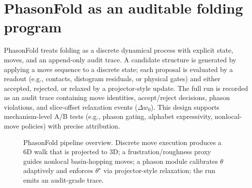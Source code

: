 \section{PhasonFold as an auditable folding program}

PhasonFold treats folding as a discrete dynamical process with explicit state, moves, and an append-only audit trace. A candidate structure is generated by applying a move sequence to a discrete state; each proposal is evaluated by a readout (e.g., contacts, distogram residuals, or physical gates) and either accepted, rejected, or relaxed by a projector-style update. The full run is recorded as an audit trace containing move identities, accept/reject decisions, phason violations, and slice-offset relaxation events ($\Delta w_0$). This design supports mechanism-level A/B tests (e.g., phason gating, alphabet expressivity, nonlocal-move policies) with precise attribution.

\begin{figure}[t]
  \centering
  \caption{PhasonFold pipeline overview. Discrete move execution produces a 6D walk that is projected to 3D; a frustration/roughness proxy guides nonlocal basin-hopping moves; a phason module calibrates $\theta$ adaptively and enforces $\theta^\star$ via projector-style relaxation; the run emits an audit-grade trace.}
  \label{fig:1}
\end{figure}
